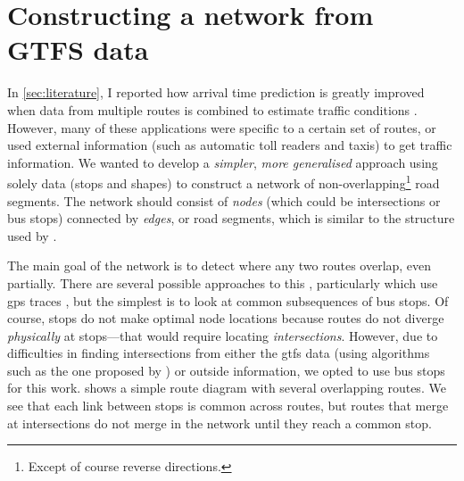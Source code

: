 

\section{Constructing a network from GTFS data}
\label{sec:route-segments}

In \cref{sec:literature}, I reported how arrival time prediction is greatly improved when data from multiple routes is combined to estimate traffic conditions \citep{Yu_2011}. However, many of these applications were specific to a certain set of routes, or used external information (such as automatic toll readers and taxis) to get \rt{} traffic information. We wanted to develop a \emph{simpler}, \emph{more generalised} approach using solely \GTFS{} data (stops and shapes) to construct a network of non-overlapping\footnote{Except of course reverse directions.} road segments. The network should consist of \emph{nodes} (which could be intersections or bus stops) connected by \emph{edges}, or road segments, which is similar to the structure used by \citet{Celan_2017,Vuurstaek_2018}.


The main goal of the network is to detect where any two routes overlap, even partially. There are several possible approaches to this , particularly which use \gls{gps} traces \citep{Xie_2016,Zhang_2017}, but the simplest is to look at common subsequences of bus stops. Of course, stops do not make optimal node locations because routes do not diverge \emph{physically} at stops---that would require locating \emph{intersections}. However, due to difficulties in finding intersections from either the \gls{gtfs} data (using algorithms such as the one proposed by \citeauthor{Xie_2016}) or outside information, we opted to use bus stops for this work.  shows a simple route diagram with several overlapping routes. We see that each link between stops is common across routes, but routes that merge at intersections do not merge in the network until they reach a common stop.


